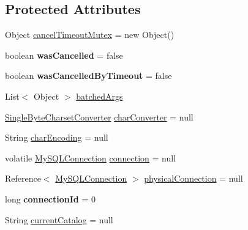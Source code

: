 \subsection*{Protected Attributes}
\begin{DoxyCompactItemize}
\item 
Object \mbox{\hyperlink{classcom_1_1mysql_1_1jdbc_1_1_statement_impl_a4a12944a42897686a4d5b2c29bf67aae}{cancel\+Timeout\+Mutex}} = new Object()
\item 
\mbox{\label{classcom_1_1mysql_1_1jdbc_1_1_statement_impl_a872ff48784f4ddb7d24a2d69b718df8d}} 
boolean {\bfseries was\+Cancelled} = false
\item 
\mbox{\label{classcom_1_1mysql_1_1jdbc_1_1_statement_impl_a26c40a6226881af58b660d86ad39cfb4}} 
boolean {\bfseries was\+Cancelled\+By\+Timeout} = false
\item 
List$<$ Object $>$ \mbox{\hyperlink{classcom_1_1mysql_1_1jdbc_1_1_statement_impl_a657d9649f7009249d67e2d6a76010298}{batched\+Args}}
\item 
\mbox{\hyperlink{classcom_1_1mysql_1_1jdbc_1_1_single_byte_charset_converter}{Single\+Byte\+Charset\+Converter}} \mbox{\hyperlink{classcom_1_1mysql_1_1jdbc_1_1_statement_impl_af67ae98efbb0e18d3eae7846eb5df708}{char\+Converter}} = null
\item 
String \mbox{\hyperlink{classcom_1_1mysql_1_1jdbc_1_1_statement_impl_ab349b69af251a448413aacf1a0a2900b}{char\+Encoding}} = null
\item 
volatile \mbox{\hyperlink{interfacecom_1_1mysql_1_1jdbc_1_1_my_s_q_l_connection}{My\+S\+Q\+L\+Connection}} \mbox{\hyperlink{classcom_1_1mysql_1_1jdbc_1_1_statement_impl_a080f9d22f2f7e863a037ffce0fc40de5}{connection}} = null
\item 
Reference$<$ \mbox{\hyperlink{interfacecom_1_1mysql_1_1jdbc_1_1_my_s_q_l_connection}{My\+S\+Q\+L\+Connection}} $>$ \mbox{\hyperlink{classcom_1_1mysql_1_1jdbc_1_1_statement_impl_ab78807d60a64ca2e0883d1f034fa976f}{physical\+Connection}} = null
\item 
\mbox{\label{classcom_1_1mysql_1_1jdbc_1_1_statement_impl_a82c0d1c3f5735c4bffbc78bed7ff7eeb}} 
long {\bfseries connection\+Id} = 0
\item 
String \mbox{\hyperlink{classcom_1_1mysql_1_1jdbc_1_1_statement_impl_a6e69857cc59dfd2e7c8cd1b96f9f287d}{current\+Catalog}} = null

\end{DoxyCompactItemize}
